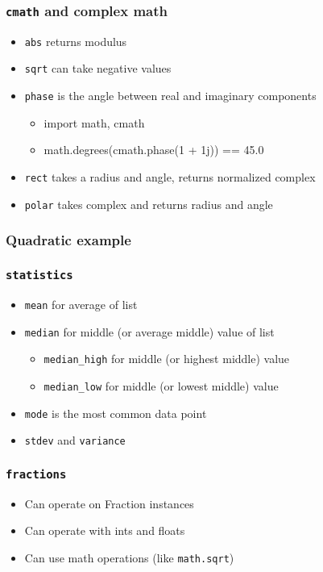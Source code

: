 \documentclass{beamer}
\begin{document}
\begin{frame}
  \frametitle{\texttt{cmath} and complex math}

  \begin{itemize}
    \item \texttt{abs} returns modulus
    \item \texttt{sqrt} can take negative values
    \item \texttt{phase} is the angle between real and imaginary components
      \begin{itemize}
        \item import math, cmath
	\item math.degrees(cmath.phase(1 + 1j)) == 45.0
      \end{itemize}
    \item \texttt{rect} takes a radius and angle, returns normalized complex
    \item \texttt{polar} takes complex and returns radius and angle
  \end{itemize}
\end{frame}

\begin{frame}
  \frametitle{Quadratic example}
\end{frame}

\begin{frame}
  \frametitle{\texttt{statistics}}

  \begin{itemize}
    \item \texttt{mean} for average of list
    \item \texttt{median} for middle (or average middle) value of list
    \begin{itemize}
      \item \texttt{median\_high} for middle (or highest middle) value
      \item \texttt{median\_low} for middle (or lowest middle) value
     \end{itemize}
    \item \texttt{mode} is the most common data point
    \item \texttt{stdev} and \texttt{variance} 
  \end{itemize}
\end{frame}

\begin{frame}
  \frametitle{\texttt{fractions}}

  \begin{itemize}
    \item Can operate on Fraction instances
    \item Can operate with ints and floats
    \item Can use math operations (like \texttt{math.sqrt})
  \end{itemize}
\end{frame}
\end{document}
